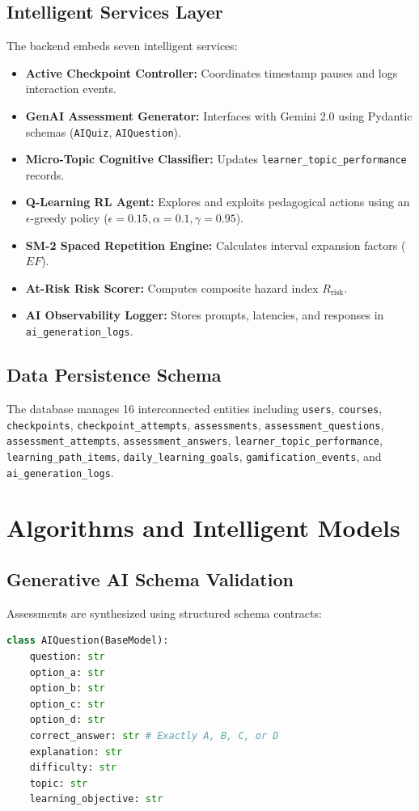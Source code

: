 \documentclass[conference]{IEEEtran}
\begin{document}
\subsection{Intelligent Services Layer}
The backend embeds seven intelligent services:
\begin{itemize}
    \item \textbf{Active Checkpoint Controller:} Coordinates timestamp pauses and logs interaction events.
    \item \textbf{GenAI Assessment Generator:} Interfaces with Gemini 2.0 using Pydantic schemas (\texttt{AIQuiz}, \texttt{AIQuestion}).
    \item \textbf{Micro-Topic Cognitive Classifier:} Updates \texttt{learner\_topic\_performance} records.
    \item \textbf{Q-Learning RL Agent:} Explores and exploits pedagogical actions using an $\epsilon$-greedy policy ($\epsilon=0.15, \alpha=0.1, \gamma=0.95$).
    \item \textbf{SM-2 Spaced Repetition Engine:} Calculates interval expansion factors ($EF$).
    \item \textbf{At-Risk Risk Scorer:} Computes composite hazard index $R_{\text{risk}}$.
    \item \textbf{AI Observability Logger:} Stores prompts, latencies, and responses in \texttt{ai\_generation\_logs}.
\end{itemize}

\subsection{Data Persistence Schema}
The database manages 16 interconnected entities including \texttt{users}, \texttt{courses}, \texttt{checkpoints}, \texttt{checkpoint\_attempts}, \texttt{assessments}, \texttt{assessment\_questions}, \texttt{assessment\_attempts}, \texttt{assessment\_answers}, \texttt{learner\_topic\_performance}, \texttt{learning\_path\_items}, \texttt{daily\_learning\_goals}, \texttt{gamification\_events}, and \texttt{ai\_generation\_logs}.

\section{Algorithms and Intelligent Models}

\subsection{Generative AI Schema Validation}
Assessments are synthesized using structured schema contracts:
\begin{lstlisting}[language=Python]
class AIQuestion(BaseModel):
    question: str
    option_a: str
    option_b: str
    option_c: str
    option_d: str
    correct_answer: str # Exactly A, B, C, or D
    explanation: str
    difficulty: str
    topic: str
    learning_objective: str
\end{lstlisting}
\end{document}
